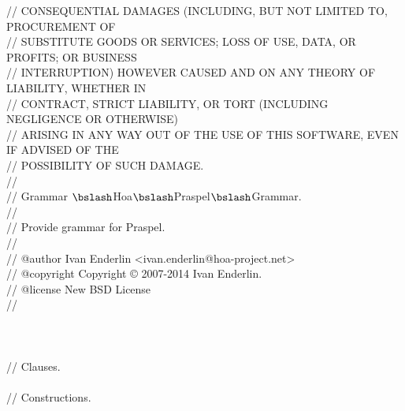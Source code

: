 \begin{bigbigpre}
// CONSEQUENTIAL DAMAGES (INCLUDING, BUT NOT LIMITED TO, PROCUREMENT OF \\
// SUBSTITUTE GOODS OR SERVICES; LOSS OF USE, DATA, OR PROFITS; OR BUSINESS \\
// INTERRUPTION) HOWEVER CAUSED AND ON ANY THEORY OF LIABILITY, WHETHER IN \\
// CONTRACT, STRICT LIABILITY, OR TORT (INCLUDING NEGLIGENCE OR OTHERWISE) \\
// ARISING IN ANY WAY OUT OF THE USE OF THIS SOFTWARE, EVEN IF ADVISED OF THE \\
// POSSIBILITY OF SUCH DAMAGE. \\
// \\
// Grammar \(\bslash\)Hoa\(\bslash\)Praspel\(\bslash\)Grammar. \\
// \\
// Provide grammar for Praspel. \\
// \\
// @author     Ivan Enderlin <ivan.enderlin@hoa-project.net> \\
// @copyright  Copyright © 2007-2014 Ivan Enderlin. \\
// @license    New BSD License \\
// \\
 \\
 \\
 \\
// Clauses. \\
 \\
// Constructions. \\

\end{bigbigpre}
